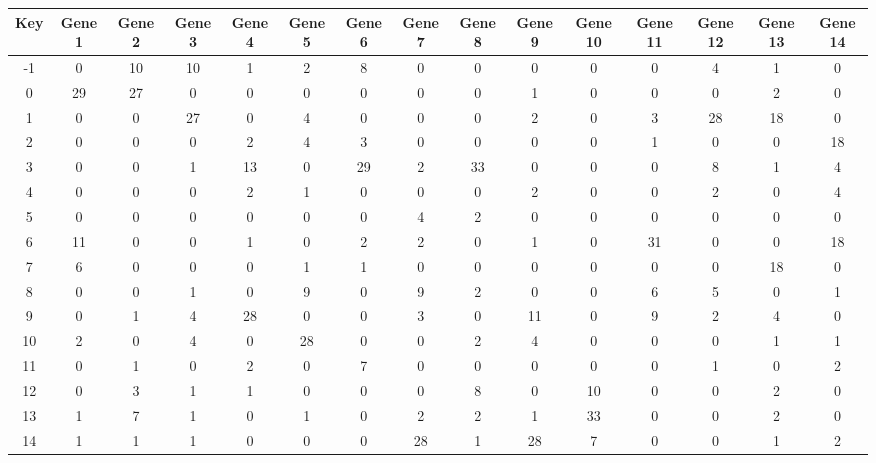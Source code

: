 \begin{tabular}{|c|c|c|c|c|c|c|c|c|c|c|c|c|c|c|}
\hline
Key & Gene 1 & Gene 2 & Gene 3 & Gene 4 & Gene 5 & Gene 6 & Gene 7 & Gene 8 & Gene 9 & Gene 10 & Gene 11 & Gene 12 & Gene 13 & Gene 14 \\
\hline
-1 & 0 & 10 & 10 & 1 & 2 & 8 & 0 & 0 & 0 & 0 & 0 & 4 & 1 & 0 \\
0 & 29 & 27 & 0 & 0 & 0 & 0 & 0 & 0 & 1 & 0 & 0 & 0 & 2 & 0 \\
1 & 0 & 0 & 27 & 0 & 4 & 0 & 0 & 0 & 2 & 0 & 3 & 28 & 18 & 0 \\
2 & 0 & 0 & 0 & 2 & 4 & 3 & 0 & 0 & 0 & 0 & 1 & 0 & 0 & 18 \\
3 & 0 & 0 & 1 & 13 & 0 & 29 & 2 & 33 & 0 & 0 & 0 & 8 & 1 & 4 \\
4 & 0 & 0 & 0 & 2 & 1 & 0 & 0 & 0 & 2 & 0 & 0 & 2 & 0 & 4 \\
5 & 0 & 0 & 0 & 0 & 0 & 0 & 4 & 2 & 0 & 0 & 0 & 0 & 0 & 0 \\
6 & 11 & 0 & 0 & 1 & 0 & 2 & 2 & 0 & 1 & 0 & 31 & 0 & 0 & 18 \\
7 & 6 & 0 & 0 & 0 & 1 & 1 & 0 & 0 & 0 & 0 & 0 & 0 & 18 & 0 \\
8 & 0 & 0 & 1 & 0 & 9 & 0 & 9 & 2 & 0 & 0 & 6 & 5 & 0 & 1 \\
9 & 0 & 1 & 4 & 28 & 0 & 0 & 3 & 0 & 11 & 0 & 9 & 2 & 4 & 0 \\
10 & 2 & 0 & 4 & 0 & 28 & 0 & 0 & 2 & 4 & 0 & 0 & 0 & 1 & 1 \\
11 & 0 & 1 & 0 & 2 & 0 & 7 & 0 & 0 & 0 & 0 & 0 & 1 & 0 & 2 \\
12 & 0 & 3 & 1 & 1 & 0 & 0 & 0 & 8 & 0 & 10 & 0 & 0 & 2 & 0 \\
13 & 1 & 7 & 1 & 0 & 1 & 0 & 2 & 2 & 1 & 33 & 0 & 0 & 2 & 0 \\
14 & 1 & 1 & 1 & 0 & 0 & 0 & 28 & 1 & 28 & 7 & 0 & 0 & 1 & 2 \\
\hline
\end{tabular}